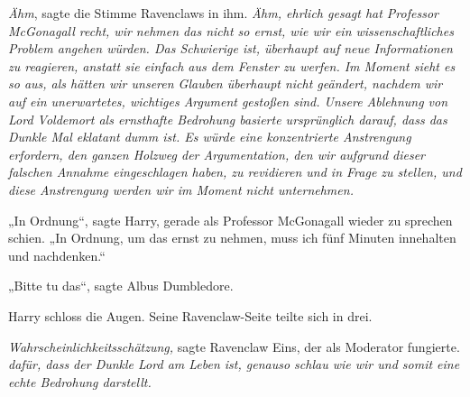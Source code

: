 \emph{Ähm}, sagte die Stimme Ravenclaws in ihm. \emph{Ähm, ehrlich gesagt hat Professor McGonagall recht, wir nehmen das nicht so ernst, wie wir ein wissenschaftliches Problem angehen würden. Das Schwierige ist, \emph{überhaupt} auf neue Informationen zu reagieren, anstatt sie einfach aus dem Fenster zu werfen. Im Moment sieht es so aus, als hätten wir unseren Glauben \emph{überhaupt nicht} geändert, nachdem wir auf ein unerwartetes, wichtiges Argument gestoßen sind. Unsere Ablehnung von Lord Voldemort als ernsthafte Bedrohung basierte \emph{ursprünglich} darauf, dass das Dunkle Mal eklatant dumm ist. Es würde eine konzentrierte Anstrengung erfordern, den ganzen Holzweg der Argumentation, den wir aufgrund dieser falschen Annahme eingeschlagen haben, zu revidieren und in Frage zu stellen, und diese Anstrengung werden wir im Moment \emph{nicht} unternehmen.}

„In Ordnung“, sagte Harry, gerade als Professor McGonagall wieder zu sprechen schien.
„In Ordnung, um das ernst zu nehmen, muss ich fünf Minuten innehalten und nachdenken.“

„Bitte tu das“, sagte Albus Dumbledore.


Harry schloss die Augen. Seine Ravenclaw-Seite teilte sich in drei.

\emph{Wahrscheinlichkeitsschätzung,} sagte Ravenclaw Eins, der als Moderator fungierte. \emph{dafür, dass der Dunkle Lord am Leben ist, genauso schlau wie wir und somit eine echte Bedrohung darstellt.}

